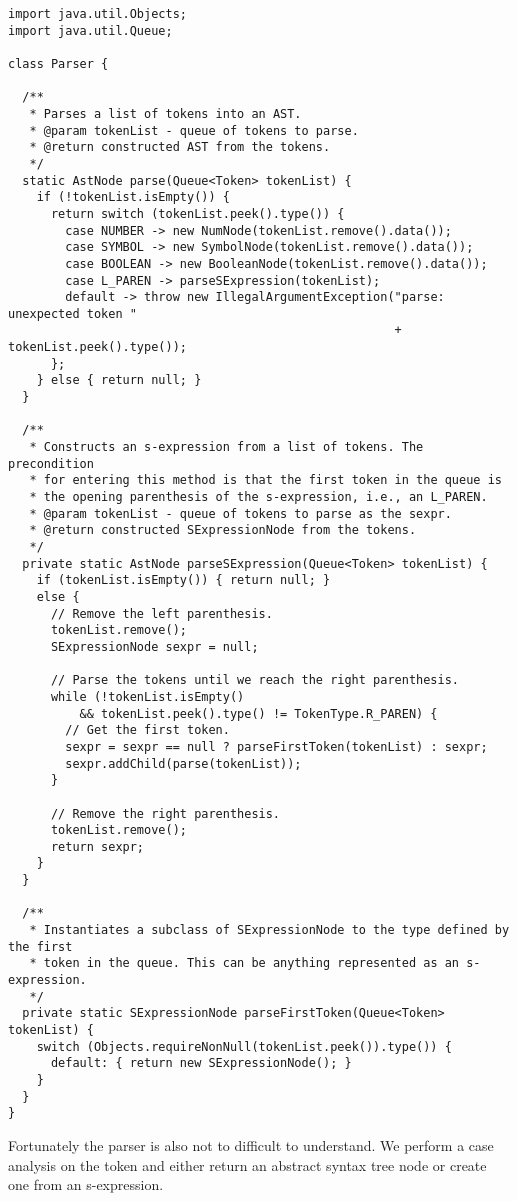 \begin{lstlisting}[language=MyJava]
import java.util.Objects;
import java.util.Queue;

class Parser {

  /**
   * Parses a list of tokens into an AST.
   * @param tokenList - queue of tokens to parse.
   * @return constructed AST from the tokens.
   */
  static AstNode parse(Queue<Token> tokenList) {
    if (!tokenList.isEmpty()) {
      return switch (tokenList.peek().type()) {
        case NUMBER -> new NumNode(tokenList.remove().data());
        case SYMBOL -> new SymbolNode(tokenList.remove().data());
        case BOOLEAN -> new BooleanNode(tokenList.remove().data());
        case L_PAREN -> parseSExpression(tokenList);
        default -> throw new IllegalArgumentException("parse: unexpected token " 
                                                      + tokenList.peek().type());
      };
    } else { return null; }
  }

  /**
   * Constructs an s-expression from a list of tokens. The precondition
   * for entering this method is that the first token in the queue is
   * the opening parenthesis of the s-expression, i.e., an L_PAREN.
   * @param tokenList - queue of tokens to parse as the sexpr.
   * @return constructed SExpressionNode from the tokens.
   */
  private static AstNode parseSExpression(Queue<Token> tokenList) {
    if (tokenList.isEmpty()) { return null; }
    else {
      // Remove the left parenthesis.
      tokenList.remove();
      SExpressionNode sexpr = null;

      // Parse the tokens until we reach the right parenthesis.
      while (!tokenList.isEmpty() 
          && tokenList.peek().type() != TokenType.R_PAREN) {
        // Get the first token.
        sexpr = sexpr == null ? parseFirstToken(tokenList) : sexpr;
        sexpr.addChild(parse(tokenList));
      }

      // Remove the right parenthesis.
      tokenList.remove();
      return sexpr;
    }
  }

  /**
   * Instantiates a subclass of SExpressionNode to the type defined by the first
   * token in the queue. This can be anything represented as an s-expression.
   */
  private static SExpressionNode parseFirstToken(Queue<Token> tokenList) {
    switch (Objects.requireNonNull(tokenList.peek()).type()) {
      default: { return new SExpressionNode(); }
    }
  }
}
\end{lstlisting}

Fortunately the parser is also not to difficult to understand. We perform a case analysis on the token and either return an abstract syntax tree node or create one from an s-expression.

